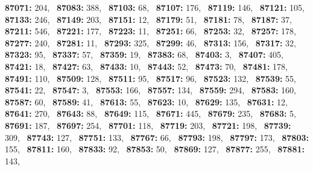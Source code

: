 \textbf{87071:} 204,\allowbreak~ 
\textbf{87083:} 388,\allowbreak~ 
\textbf{87103:} 68,\allowbreak~ 
\textbf{87107:} 176,\allowbreak~ 
\textbf{87119:} 146,\allowbreak~ 
\textbf{87121:} 105,\allowbreak~ 
\textbf{87133:} 246,\allowbreak~ 
\textbf{87149:} 203,\allowbreak~ 
\textbf{87151:} 12,\allowbreak~ 
\textbf{87179:} 51,\allowbreak~ 
\textbf{87181:} 78,\allowbreak~ 
\textbf{87187:} 37,\allowbreak~ 
\textbf{87211:} 546,\allowbreak~ 
\textbf{87221:} 177,\allowbreak~ 
\textbf{87223:} 11,\allowbreak~ 
\textbf{87251:} 66,\allowbreak~ 
\textbf{87253:} 32,\allowbreak~ 
\textbf{87257:} 178,\allowbreak~ 
\textbf{87277:} 240,\allowbreak~ 
\textbf{87281:} 11,\allowbreak~ 
\textbf{87293:} 325,\allowbreak~ 
\textbf{87299:} 46,\allowbreak~ 
\textbf{87313:} 156,\allowbreak~ 
\textbf{87317:} 32,\allowbreak~ 
\textbf{87323:} 95,\allowbreak~ 
\textbf{87337:} 57,\allowbreak~ 
\textbf{87359:} 19,\allowbreak~ 
\textbf{87383:} 68,\allowbreak~ 
\textbf{87403:} 3,\allowbreak~ 
\textbf{87407:} 405,\allowbreak~ 
\textbf{87421:} 18,\allowbreak~ 
\textbf{87427:} 63,\allowbreak~ 
\textbf{87433:} 10,\allowbreak~ 
\textbf{87443:} 52,\allowbreak~ 
\textbf{87473:} 70,\allowbreak~ 
\textbf{87481:} 178,\allowbreak~ 
\textbf{87491:} 110,\allowbreak~ 
\textbf{87509:} 128,\allowbreak~ 
\textbf{87511:} 95,\allowbreak~ 
\textbf{87517:} 96,\allowbreak~ 
\textbf{87523:} 132,\allowbreak~ 
\textbf{87539:} 55,\allowbreak~ 
\textbf{87541:} 22,\allowbreak~ 
\textbf{87547:} 3,\allowbreak~ 
\textbf{87553:} 166,\allowbreak~ 
\textbf{87557:} 134,\allowbreak~ 
\textbf{87559:} 294,\allowbreak~ 
\textbf{87583:} 160,\allowbreak~ 
\textbf{87587:} 60,\allowbreak~ 
\textbf{87589:} 41,\allowbreak~ 
\textbf{87613:} 55,\allowbreak~ 
\textbf{87623:} 10,\allowbreak~ 
\textbf{87629:} 135,\allowbreak~ 
\textbf{87631:} 12,\allowbreak~ 
\textbf{87641:} 270,\allowbreak~ 
\textbf{87643:} 88,\allowbreak~ 
\textbf{87649:} 115,\allowbreak~ 
\textbf{87671:} 445,\allowbreak~ 
\textbf{87679:} 235,\allowbreak~ 
\textbf{87683:} 5,\allowbreak~ 
\textbf{87691:} 187,\allowbreak~ 
\textbf{87697:} 254,\allowbreak~ 
\textbf{87701:} 118,\allowbreak~ 
\textbf{87719:} 203,\allowbreak~ 
\textbf{87721:} 198,\allowbreak~ 
\textbf{87739:} 309,\allowbreak~ 
\textbf{87743:} 127,\allowbreak~ 
\textbf{87751:} 133,\allowbreak~ 
\textbf{87767:} 66,\allowbreak~ 
\textbf{87793:} 198,\allowbreak~ 
\textbf{87797:} 173,\allowbreak~ 
\textbf{87803:} 155,\allowbreak~ 
\textbf{87811:} 160,\allowbreak~ 
\textbf{87833:} 92,\allowbreak~ 
\textbf{87853:} 50,\allowbreak~ 
\textbf{87869:} 127,\allowbreak~ 
\textbf{87877:} 255,\allowbreak~ 
\textbf{87881:} 143,\allowbreak~ 
